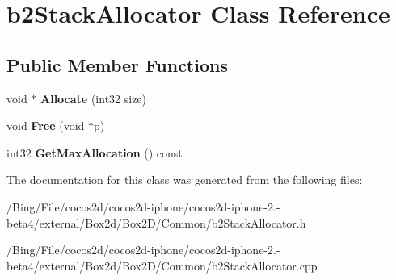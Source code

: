 \hypertarget{classb2_stack_allocator}{\section{b2\-Stack\-Allocator Class Reference}
\label{classb2_stack_allocator}
}
\subsection*{Public Member Functions}
\begin{DoxyCompactItemize}
\item 
\hypertarget{classb2_stack_allocator_a4b8c515d8e1a1c2d5b151c3a2f96fa19}{void $\ast$ {\bfseries Allocate} (int32 size)}\label{classb2_stack_allocator_a4b8c515d8e1a1c2d5b151c3a2f96fa19}

\item 
\hypertarget{classb2_stack_allocator_a3a4384cf5f467828db3022985673db66}{void {\bfseries Free} (void $\ast$p)}\label{classb2_stack_allocator_a3a4384cf5f467828db3022985673db66}

\item 
\hypertarget{classb2_stack_allocator_a1530b6889eaa679ab1b0e092e4911366}{int32 {\bfseries Get\-Max\-Allocation} () const }\label{classb2_stack_allocator_a1530b6889eaa679ab1b0e092e4911366}

\end{DoxyCompactItemize}


The documentation for this class was generated from the following files\-:\begin{DoxyCompactItemize}
\item 
/\-Bing/\-File/cocos2d/cocos2d-\/iphone/cocos2d-\/iphone-\/2.-\/beta4/external/\-Box2d/\-Box2\-D/\-Common/b2\-Stack\-Allocator.\-h\item 
/\-Bing/\-File/cocos2d/cocos2d-\/iphone/cocos2d-\/iphone-\/2.-\/beta4/external/\-Box2d/\-Box2\-D/\-Common/b2\-Stack\-Allocator.\-cpp\end{DoxyCompactItemize}
